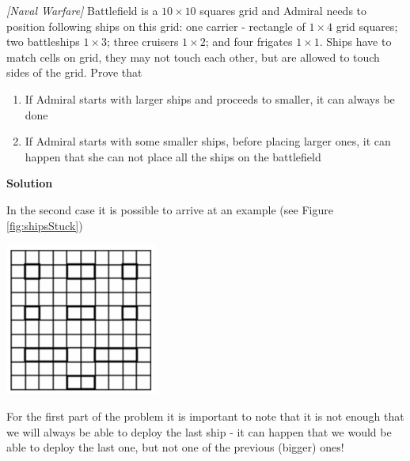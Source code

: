 

%

\renewcommand{\theenumi}{\alph{enumi}}


\renewcommand\thesubfigure{(\alph{subfigure})} %



\noindent 

\begin{problem}
\textit{[Naval Warfare]} 
Battlefield is a $10 \times 10$ squares grid and Admiral needs to position following ships on this grid: one carrier - rectangle of $1 \times 4$ grid squares; two battleships $1\times3$; three cruisers $1\times2$; and four frigates $1\times1$. Ships have to match cells on grid, they may not touch each other, but are allowed to touch sides of the grid. Prove that
\begin{enumerate}
\item If Admiral starts with larger ships and proceeds to smaller, it can always be done
\item If Admiral starts with some smaller ships, before placing larger ones, it can happen that she can not place all the ships on the battlefield
\end{enumerate}

\textbf{Solution}

In the second case it is possible to arrive at an example (see Figure \ref{fig:shipsStuck})

\begin{center}
\includegraphics[width=5cm]{StuckShips.png}
\label{fig:shipsStuck}
\end{center}


For the first part of the problem it is important to note that it is not enough that we will always be able to deploy the last ship - it can happen that we would be able to deploy the last one, but not one of the previous (bigger) ones!


\end{problem}
